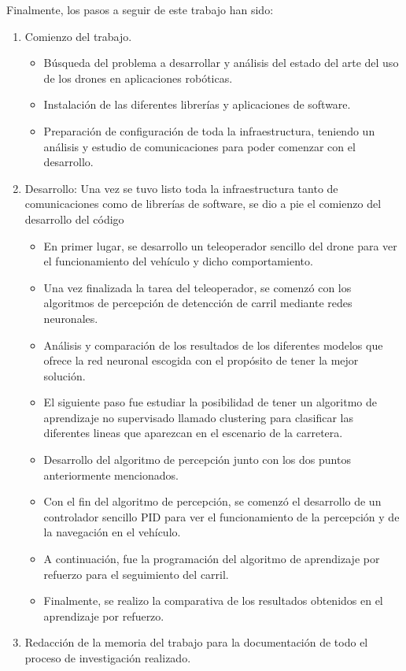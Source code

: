 Finalmente, los pasos a seguir de este trabajo han sido: 
\begin{enumerate}
    \item Comienzo del trabajo. 
    \begin{itemize}
        \item Búsqueda del problema a desarrollar y análisis del estado del arte del uso de los drones en aplicaciones robóticas.
        \item Instalación de las diferentes librerías y aplicaciones de software. 
        \item Preparación de configuración de toda la infraestructura, teniendo un análisis y estudio de comunicaciones para poder comenzar con el desarrollo. 
    \end{itemize}
    \item Desarrollo: Una vez se tuvo listo toda la infraestructura tanto de comunicaciones como de librerías de software, se dio a pie el comienzo del desarrollo del código
        \begin{itemize}
            \item En primer lugar, se desarrollo un teleoperador sencillo del drone para ver el funcionamiento del vehículo y dicho comportamiento.
            \item Una vez finalizada la tarea del teleoperador, se comenzó con los algoritmos de percepción de detencción de carril mediante redes neuronales.
            \item Análisis y comparación de los resultados de los diferentes modelos que ofrece la red neuronal escogida con el propósito de tener la mejor solución. 
            \item El siguiente paso fue estudiar la posibilidad de tener un algoritmo de aprendizaje no supervisado llamado clustering para clasificar las diferentes lineas que aparezcan en el escenario de la carretera.
            \item Desarrollo del algoritmo de percepción junto con los dos puntos anteriormente mencionados.
            \item Con el fin del algoritmo de percepción, se comenzó el desarrollo de un controlador sencillo PID para ver el funcionamiento de la percepción y de la navegación en el vehículo. 
            \item A continuación, fue la programación del algoritmo de aprendizaje por refuerzo para el seguimiento del carril.
            \item Finalmente,  se realizo la comparativa de los resultados obtenidos en el aprendizaje por refuerzo. 
        \end{itemize}
        \item Redacción de la memoria del trabajo para la documentación de todo el proceso de investigación realizado. 
\end{enumerate}


